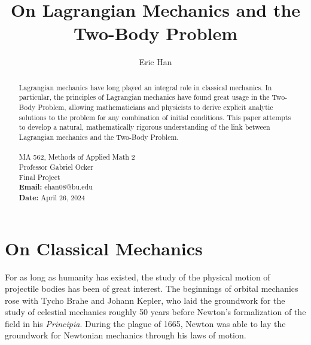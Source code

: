 \documentclass[10pt, psamsfonts]{amsart}
\title{On Lagrangian Mechanics and the Two-Body Problem}
\author{Eric Han}
\theoremstyle{definition}
\theoremstyle{remark}
\numberwithin{equation}{section}
\begin{document}
\begin{abstract}
Lagrangian mechanics have long played an integral role in classical mechanics. In particular, the principles of Lagrangian mechanics have found great usage in the Two-Body Problem, allowing mathematicians and physicists to derive explicit analytic solutions to the problem for any combination of initial conditions. This paper attempts to develop a natural, mathematically rigorous understanding of the link between Lagrangian mechanics and the Two-Body Problem.
\\\\
\noindent MA 562, Methods of Applied Math 2 \\
\noindent Professor Gabriel Ocker \\
\noindent Final Project\\
\noindent \textbf{Email:} ehan08@bu.edu\\
\noindent \textbf{Date:} April 26, 2024
\end{abstract}

\maketitle
\tableofcontents
\newpage

\section*{On Classical Mechanics}
For as long as humanity has existed, the study of the physical motion of projectile bodies has been of great interest. The beginnings of orbital mechanics rose with Tycho Brahe and Johann Kepler, who laid the groundwork for the study of celestial mechanics roughly 50 years before Newton's formalization of the field in his \textit{Principia}. During the plague of 1665, Newton was able to lay the groundwork for Newtonian mechanics through his laws of motion.
\end{document}

